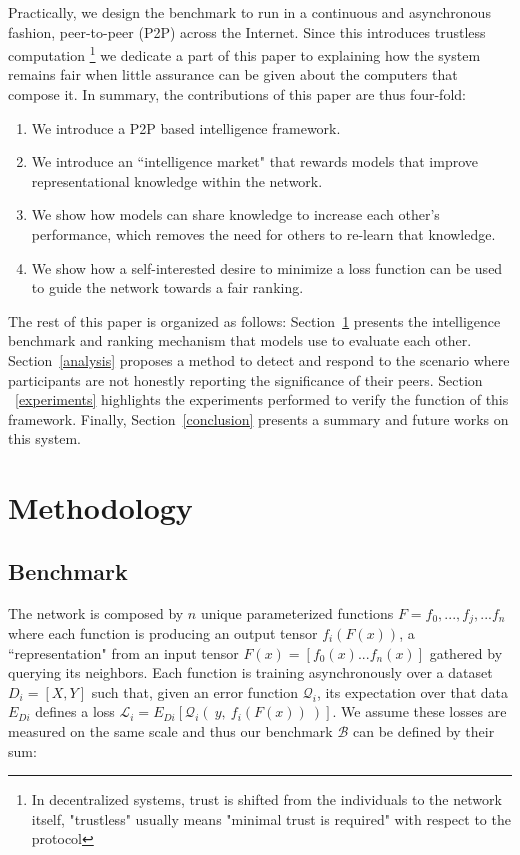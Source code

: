 \documentclass{article}
\begin{document}
Practically, we design the benchmark to run in a continuous and asynchronous fashion, peer-to-peer (P2P) across the Internet. Since this introduces trustless computation \footnote{ In decentralized systems, trust is shifted from the individuals to the network itself, "trustless" usually means "minimal trust is required" with respect to the protocol} we dedicate a part of this paper to explaining how the system remains fair when little assurance can be given about the computers that compose it. In summary, the contributions of this paper are thus four-fold:
\begin{enumerate}
	\item We introduce a P2P based intelligence framework.
	\item We introduce an ``intelligence market" that rewards models that improve representational knowledge within the network.
	\item We show how models can share knowledge to increase each other's performance, which removes the need for others to re-learn that knowledge. 
	\item We show how a self-interested desire to minimize a loss function can be used to guide the network towards a fair ranking.
\end{enumerate}

The rest of this paper is organized as follows: Section~\ref{methodology} presents the intelligence benchmark and ranking mechanism that models use to evaluate each other. Section~\ref{analysis} proposes a method to detect and respond to the scenario where participants are not honestly reporting the significance of their peers. Section ~\ref{experiments} highlights the experiments performed to verify the function of this framework. Finally, Section~\ref{conclusion} presents a summary and future works on this system.

\section{Methodology}
\label{methodology}

\subsection{Benchmark}

The network is composed by $n$ unique parameterized functions $F = {f_0, ...,  f_j, ...f_n}$ where each function is producing an output tensor $f_i(F(x))$, a ``representation" from an input tensor $F(x) = [f_0{(x)} ... f_n{(x)}]$ gathered by querying its neighbors. Each function is training asynchronously over a dataset $D_i=[X,Y]$ such that, given an error function $\mathcal{Q}_i$, its expectation over that data $E_{Di}$ defines a loss $\mathcal{L}_i = E_{Di}[\mathcal{Q}_i( \ y, \ f_i(F(x)) \ )]$. We assume these losses are measured on the same scale and thus our benchmark $\mathcal{B}$ can be defined by their sum:
\end{document}
